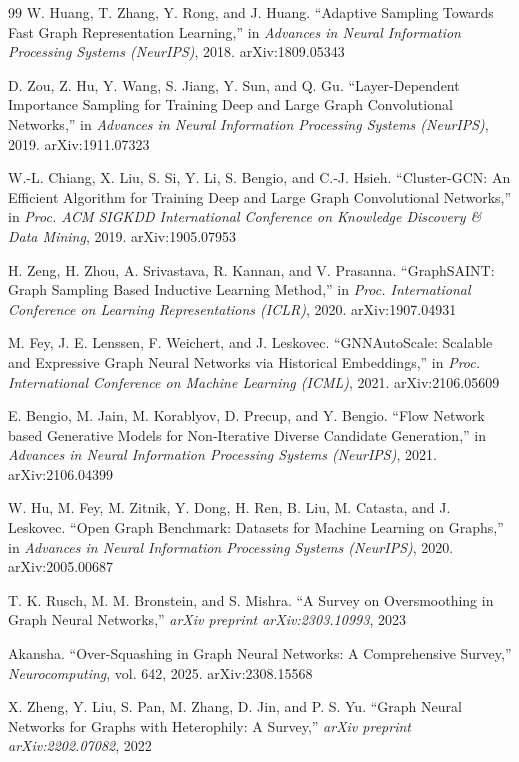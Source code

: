 \begin{thebibliography}{99}
W. Huang, T. Zhang, Y. Rong, and J. Huang. ``Adaptive Sampling Towards Fast Graph Representation Learning,'' in \textit{Advances in Neural Information Processing Systems (NeurIPS)}, 2018. arXiv:1809.05343

D. Zou, Z. Hu, Y. Wang, S. Jiang, Y. Sun, and Q. Gu. ``Layer-Dependent Importance Sampling for Training Deep and Large Graph Convolutional Networks,'' in \textit{Advances in Neural Information Processing Systems (NeurIPS)}, 2019. arXiv:1911.07323

W.-L. Chiang, X. Liu, S. Si, Y. Li, S. Bengio, and C.-J. Hsieh. ``Cluster-GCN: An Efficient Algorithm for Training Deep and Large Graph Convolutional Networks,'' in \textit{Proc. ACM SIGKDD International Conference on Knowledge Discovery \& Data Mining}, 2019. arXiv:1905.07953

H. Zeng, H. Zhou, A. Srivastava, R. Kannan, and V. Prasanna. ``GraphSAINT: Graph Sampling Based Inductive Learning Method,'' in \textit{Proc. International Conference on Learning Representations (ICLR)}, 2020. arXiv:1907.04931

M. Fey, J. E. Lenssen, F. Weichert, and J. Leskovec. ``GNNAutoScale: Scalable and Expressive Graph Neural Networks via Historical Embeddings,'' in \textit{Proc. International Conference on Machine Learning (ICML)}, 2021. arXiv:2106.05609

E. Bengio, M. Jain, M. Korablyov, D. Precup, and Y. Bengio. ``Flow Network based Generative Models for Non-Iterative Diverse Candidate Generation,'' in \textit{Advances in Neural Information Processing Systems (NeurIPS)}, 2021. arXiv:2106.04399

W. Hu, M. Fey, M. Zitnik, Y. Dong, H. Ren, B. Liu, M. Catasta, and J. Leskovec. ``Open Graph Benchmark: Datasets for Machine Learning on Graphs,'' in \textit{Advances in Neural Information Processing Systems (NeurIPS)}, 2020. arXiv:2005.00687

T. K. Rusch, M. M. Bronstein, and S. Mishra. ``A Survey on Oversmoothing in Graph Neural Networks,'' \textit{arXiv preprint arXiv:2303.10993}, 2023

Akansha. ``Over-Squashing in Graph Neural Networks: A Comprehensive Survey,'' \textit{Neurocomputing}, vol. 642, 2025. arXiv:2308.15568

X. Zheng, Y. Liu, S. Pan, M. Zhang, D. Jin, and P. S. Yu. ``Graph Neural Networks for Graphs with Heterophily: A Survey,'' \textit{arXiv preprint arXiv:2202.07082}, 2022


\end{thebibliography}
